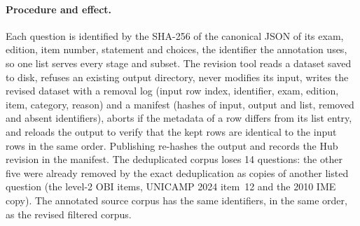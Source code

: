 \paragraph{Procedure and effect.} Each question is identified by the SHA-256
of the canonical JSON of its exam, edition, item number, statement and
choices, the identifier the annotation uses, so one list serves every stage
and subset. The revision tool reads a dataset saved to disk, refuses an
existing output directory, never modifies its input, writes the revised
dataset with a removal log (input row index, identifier, exam, edition, item,
category, reason) and a manifest (hashes of input, output and list, removed
and absent identifiers), aborts if the metadata of a row differs from its
list entry, and reloads the output to verify that the kept rows are identical
to the input rows in the same order. Publishing re-hashes the output and
records the Hub revision in the manifest. The deduplicated corpus loses 14
questions: the other five were already removed by the exact deduplication as
copies of another listed question (the level-2 OBI items, UNICAMP 2024
item~12 and the 2010 IME copy). The annotated source corpus has the same
identifiers, in the same order, as the revised filtered corpus.

\begin{table}[t]
\centering
\scriptsize
\setlength{\tabcolsep}{3pt}
\caption{Datasets revised with the list. \emph{Rem.}: rows removed. Revisions are those of \textcolor{red}{\texttt{bench-temp-2/mmlu-pt-revised} (filtered), \texttt{bench-temp-2/mmlu-pt-deduplicated} and \texttt{bench-temp-2/mmlu-pt-knowledge-annotated}, pushed on 8~October~2026}; the abstention subset is a local working dataset.}
\label{tab:rev-short-datasets}
\end{table}

